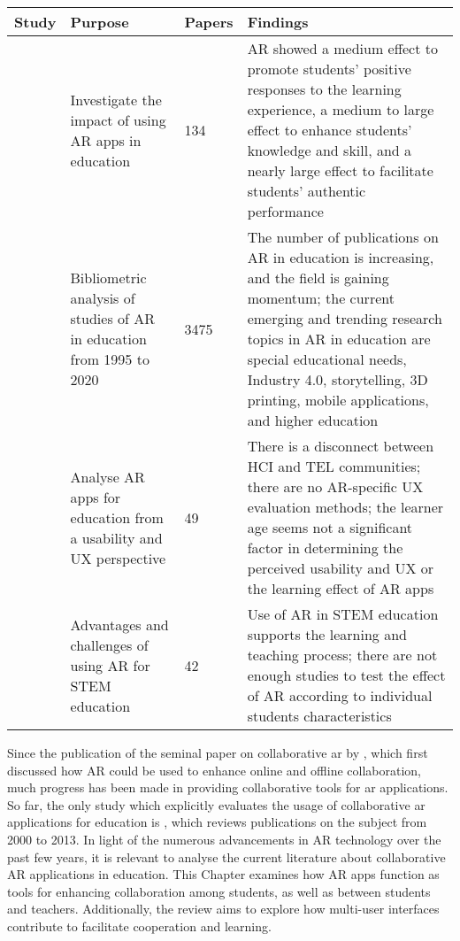\begin{table*}[htbp]
\caption{\fontsize{10pt}{11pt}}
\label{tab:slrsummary}
\small
\begin{tabular}{M{2.7cm}M{2.9cm}M{1.2cm}M{4.7cm}}
    \toprule
         \textbf{Study} & \textbf{Purpose} & \textbf{Papers} & \textbf{Findings} \\
    \midrule
         \cite{chang2022ten} & Investigate the impact of using AR apps in education & 134 & AR showed a medium effect to promote students’ positive responses to the learning experience, a medium to large effect to enhance students’ knowledge and skill, and a nearly large effect to facilitate students’ authentic performance \\
    \midrule     
          \cite{avila2021augmented} & Bibliometric analysis of studies of AR in education from 1995 to 2020 & 3475 & The number of publications on AR in education is increasing, and the field is gaining momentum; the current emerging and trending research topics in AR in education are special educational needs, Industry 4.0, storytelling, 3D printing, mobile applications, and higher education \\
   \midrule 
        \cite{law2021augmented} & Analyse AR apps for education from a usability and UX perspective & 49 & There is a disconnect between HCI and TEL communities; there are no AR-specific UX evaluation methods; the learner age seems not a significant factor in determining the perceived usability and UX or the learning effect of AR apps \\
    \midrule
         \cite{sirakaya2022augmented} & Advantages and challenges of using AR for STEM education & 42 & Use of AR in STEM education supports the learning and teaching process; there are not enough studies to test the effect of AR according to individual students characteristics \\
    \bottomrule

\end{tabular}
\end{table*}

Since the publication of the seminal paper on collaborative \gls{ar} by \cite{billinghurst2002collaborative}, which first discussed how AR could be used to enhance online and offline collaboration, much progress has been made in providing collaborative tools for \gls{ar} applications. So far, the only study which explicitly evaluates the usage of collaborative \gls{ar} applications for education is \citep{6821833}, which reviews publications on the subject from 2000 to 2013. In light of the numerous advancements in AR technology over the past few years, it is relevant to analyse the current literature about collaborative AR applications in education. This Chapter examines how AR apps function as tools for enhancing collaboration among students, as well as between students and teachers. Additionally, the review aims to explore how multi-user interfaces contribute to facilitate cooperation and learning.

